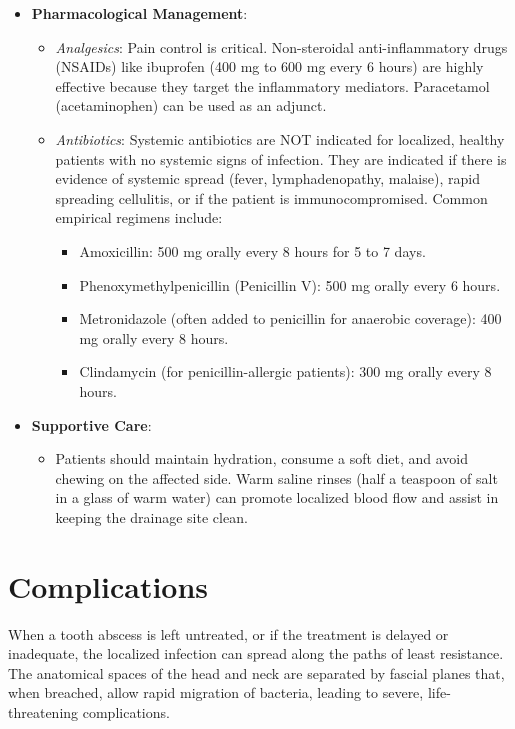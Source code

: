 \begin{itemize}
\begin{itemize}
    \end{itemize}
  \item \textbf{Pharmacological Management}:
    \begin{itemize}
      \item \textit{Analgesics}: Pain control is critical. Non-steroidal anti-inflammatory drugs (NSAIDs) like ibuprofen (400 mg to 600 mg every 6 hours) are highly effective because they target the inflammatory mediators. Paracetamol (acetaminophen) can be used as an adjunct.
      \item \textit{Antibiotics}: Systemic antibiotics are NOT indicated for localized, healthy patients with no systemic signs of infection. They are indicated if there is evidence of systemic spread (fever, lymphadenopathy, malaise), rapid spreading cellulitis, or if the patient is immunocompromised. Common empirical regimens include:
        \begin{itemize}
          \item Amoxicillin: 500 mg orally every 8 hours for 5 to 7 days.
          \item Phenoxymethylpenicillin (Penicillin V): 500 mg orally every 6 hours.
          \item Metronidazole (often added to penicillin for anaerobic coverage): 400 mg orally every 8 hours.
          \item Clindamycin (for penicillin-allergic patients): 300 mg orally every 8 hours.
        \end{itemize}
    \end{itemize}
  \item \textbf{Supportive Care}:
    \begin{itemize}
      \item Patients should maintain hydration, consume a soft diet, and avoid chewing on the affected side. Warm saline rinses (half a teaspoon of salt in a glass of warm water) can promote localized blood flow and assist in keeping the drainage site clean.
    \end{itemize}
\end{itemize}

\section*{Complications}
When a tooth abscess is left untreated, or if the treatment is delayed or inadequate, the localized infection can spread along the paths of least resistance. The anatomical spaces of the head and neck are separated by fascial planes that, when breached, allow rapid migration of bacteria, leading to severe, life-threatening complications.

